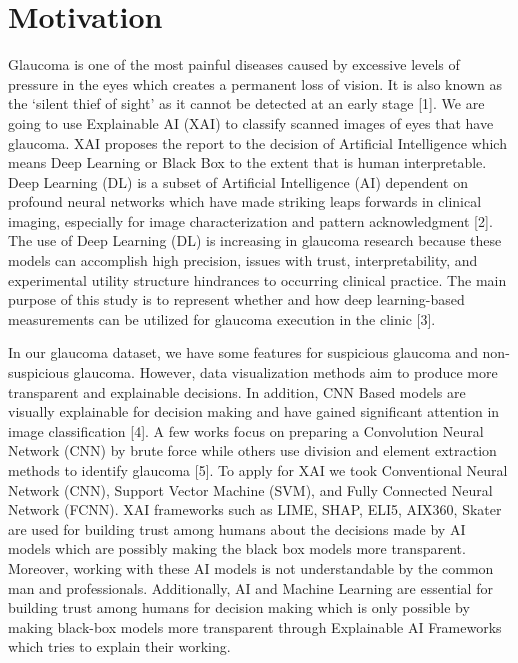 \section{Motivation} 
Glaucoma is one of the most painful diseases caused by excessive levels of pressure in the eyes which creates a permanent loss of vision. It is also known as the ‘silent thief of sight’ as it cannot be detected at an early stage [1]. We are going to use Explainable AI (XAI) to classify scanned images of eyes that have glaucoma. XAI proposes the report to the decision of Artificial Intelligence which means Deep Learning or Black Box to the extent that is human interpretable. Deep Learning (DL) is a subset of Artificial Intelligence (AI) dependent on profound neural networks which have made striking leaps forwards in clinical imaging, especially for image characterization and pattern acknowledgment [2]. The use of Deep Learning (DL) is increasing in glaucoma research because these models can accomplish high precision, issues with trust, interpretability, and experimental utility structure hindrances to occurring clinical practice. The main purpose of this study is to represent whether and how deep learning-based measurements can be utilized for glaucoma execution in the clinic [3].

\vspace{5mm}
\noindent In our glaucoma dataset, we have some features for suspicious glaucoma and non-suspicious glaucoma. However, data visualization methods aim to produce more transparent and explainable decisions. In addition, CNN Based models are visually explainable for decision making and have gained significant attention in image classification [4]. A few works focus on preparing a Convolution Neural Network (CNN) by brute force while others use division and element extraction methods to identify glaucoma [5]. To apply for XAI we took Conventional Neural Network (CNN), Support Vector Machine (SVM), and Fully Connected Neural Network (FCNN). XAI frameworks such as LIME, SHAP, ELI5, AIX360, Skater are used for building trust among humans about the decisions made by AI models which are possibly making the black box models more transparent. Moreover, working with these AI models is not understandable by the common man and professionals. Additionally, AI and Machine Learning are essential for building trust among humans for decision making which is only possible by making black-box models more transparent through Explainable AI Frameworks which tries to explain their working.

